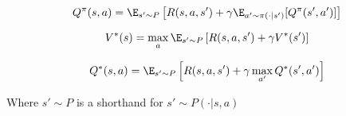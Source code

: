 \begin{equation}
    Q^{\pi}(s, a) = \E_{s' \sim P}\left[R(s, a, s') + \gamma \E_{a'\sim \pi(\cdot | s')}[Q^{\pi}(s', a')] \right]
\label{eq:bellman-q}
\end{equation}

\begin{equation}
    V^*(s) = \max_a \E_{s' \sim P}\left[R(s, a, s') + \gamma V^*(s')\right]
\label{eq:bellman-v*}
\end{equation}

\begin{equation}
    Q^*(s, a) = \E_{s' \sim P}\left[R(s, a, s') + \gamma \max_{a'} Q^*(s', a')\right]
\label{eq:bellman-q*}
\end{equation}

Where $s' \sim P$ is a shorthand for $s' \sim P(\cdot|s,a)$